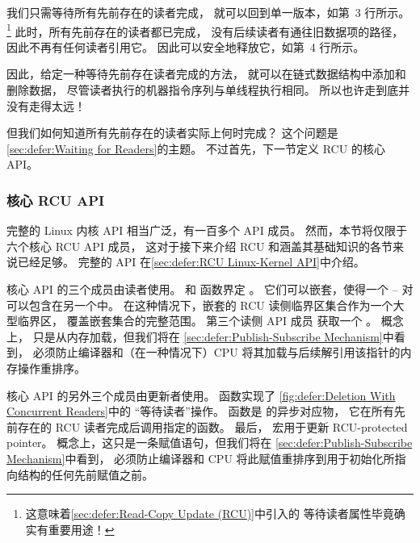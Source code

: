 我们只需等待所有先前存在的读者完成，
就可以回到单一版本，如第~3 行所示。\footnote{
	这意味着\cref{sec:defer:Read-Copy Update (RCU)}中引入的
	等待读者属性毕竟确实有重要用途！}
此时，所有先前存在的读者都已完成，
没有后续读者有通往旧数据项的路径，
因此不再有任何读者引用它。
因此可以安全地释放它，如第~4 行所示。

因此，给定一种等待先前存在读者完成的方法，
就可以在链式数据结构中添加和删除数据，
尽管读者执行的机器指令序列与单线程执行相同。
所以也许走到底并没有走得太远！

但我们如何知道所有先前存在的读者实际上何时完成？
这个问题是\cref{sec:defer:Waiting for Readers}的主题。
不过首先，下一节定义 RCU 的核心 API。

\subsubsection{核心 RCU API}
\label{sec:defer:Core RCU API}

完整的 Linux 内核 API 相当广泛，有一百多个 API 成员。
然而，本节将仅限于六个核心 RCU API 成员，
这对于接下来介绍 RCU 和涵盖其基础知识的各节来说已经足够。
完整的 API 在\cref{sec:defer:RCU Linux-Kernel API}中介绍。

核心 API 的三个成员由读者使用。
 和  函数界定
。
它们可以嵌套，使得一个
-- 对可以包含在另一个中。
在这种情况下，嵌套的 RCU 读侧临界区集合作为一个大型临界区，
覆盖嵌套集合的完整范围。
第三个读侧 API 成员  获取一个
。
概念上， 只是从内存加载，但我们将在
\cref{sec:defer:Publish-Subscribe Mechanism}中看到，
 必须防止编译器和（在一种情况下）CPU
将其加载与后续解引用该指针的内存操作重排序。

\QuickQuizEnd

核心 API 的另外三个成员由更新者使用。
 函数实现了
\cref{fig:defer:Deletion With Concurrent Readers}中的
``等待读者''操作。
 函数是  的异步对应物，
它在所有先前存在的 RCU 读者完成后调用指定的函数。
最后， 宏用于更新 RCU-protected pointer。
概念上，这只是一条赋值语句，但我们将在
\cref{sec:defer:Publish-Subscribe Mechanism}中看到，
 必须防止编译器和 CPU
将此赋值重排序到用于初始化所指向结构的任何先前赋值之前。

